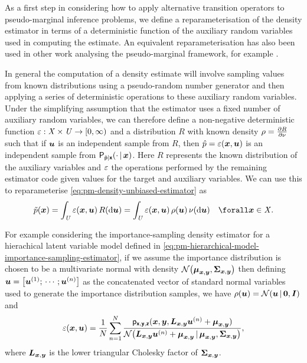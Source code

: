 As a first step in considering how to apply alternative transition operators to pseudo-marginal inference problems, we define a reparameterisation of the density estimator in terms of a deterministic function of the auxiliary random variables used in computing the estimate. An equivalent reparameterisation has also been used in other work analysing the pseudo-marginal framework, for example \citep{doucet2015efficient}.

In general the computation of a density estimate will involve sampling values from known distributions using a pseudo-random number generator and then applying a series of deterministic operations to these auxiliary random variables. Under the simplifying assumption that the estimator uses a fixed number of auxiliary random variables, we can therefore define a non-negative deterministic function $\varepsilon : \mathit{X} \times \mathit{U} \to [0,\infty)$ and a distribution $R$ with known density $\rho = \frac{\partial R}{\partial \nu}$ such that if $\boldsymbol{u}$ is an independent sample from $R$, then $\hat{p} = \varepsilon(\boldsymbol{x},\boldsymbol{u})$ is an independent sample from $\mathsf{P}_{\hat{\mathsf{p}}|\boldsymbol{\mathsf{x}}}( \cdot \operatorname{|} \boldsymbol{x})$. Here $R$ represents the known distribution of the auxiliary variables and $\varepsilon$ the operations performed by the remaining estimator code given values for the target and auxiliary variables. We can use this to reparameterise \eqref{eq:pm-density-unbiased-estimator} as
\begin{equation}\label{eq:density-unbiased-estimator-property}
  \utgtdens(\vct{x}) =
  \int_{\set{U}} \esttgtdens(\vct{x},\vct{u})\,R(\dr\vct{u}) =
  \int_{\set{U}} \esttgtdens(\vct{x},\vct{u})\,\rho(\vct{u})\,\nu(\dr\vct{u})
  \quad \forall \vct{x} \in \set{X}.
\end{equation}

For example considering the importance-sampling density estimator for a hierachical latent variable model defined in \eqref{eq:pm-hierarchical-model-importance-sampling-estimator}, if we assume the importance distribution is chosen to be a multivariate normal with density $\nrm{\vct{\mu}_{\vct{x},\vct{y}},\mtx{\Sigma}_{\vct{x},\vct{y}}}$ then defining $\vct{u} = \lsb \vct{u}^{(1)}; \,\cdots\,; \vct{u}^{(n)}\rsb$ as the concatenated vector of standard normal variables used to generate the importance distribution samples, we have $\rho(\vct{u}) = \nrm{\vct{u}\gvn\vct{0},\mtx{I}}$ and
\begin{equation}\label{eq:importance-sampling-density-estimator-reparameterisation}
  \esttgtdens(\vct{x},\vct{u}) = \frac{1}{N} \sum_{n=1}^N
  \frac
    {\pden{\rvct{x},\rvct{y},\rvct{z}}(\vct{x},\vct{y},\mtx{L}_{\vct{x},\vct{y}}\vct{u}^{(n)} + \vct{\mu}_{\vct{x},\vct{y}})}
    {\nrm{\mtx{L}_{\vct{x},\vct{y}}\vct{u}^{(n)} + \vct{\mu}_{\vct{x},\vct{y}} \gvn \vct{\mu}_{\vct{x},\vct{y}},\mtx{\Sigma}_{\vct{x},\vct{y}}}},
\end{equation}
where $\boldsymbol{L}_{\boldsymbol{x},\boldsymbol{y}}$ is the lower triangular Cholesky factor of $\boldsymbol{\Sigma}_{\boldsymbol{x},\boldsymbol{y}}$.

